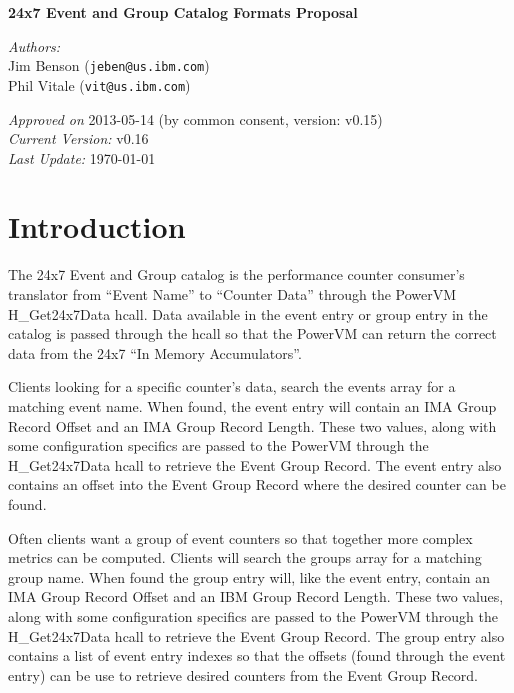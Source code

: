 \documentclass[14]{article}
\begin{document}
\begin{center}

{ \huge \bfseries 24x7 Event and Group Catalog Formats Proposal \\[0.4cm] }

\end{center}
\noindent
\emph{Authors:}\\
Jim Benson (\texttt{jeben@us.ibm.com}) \\
Phil Vitale (\texttt{vit@us.ibm.com}) \\

\begin{center}
\emph{Approved on} 2013-05-14 (by common consent, version: v0.15) \\
\emph{Current Version:} v0.16 \\
\emph{Last Update:} \today
\end{center}

\pagebreak
\tableofcontents
\pagebreak

\section{Introduction}
The 24x7 Event and Group catalog is the performance counter consumer's
translator from ``Event Name'' to ``Counter Data'' through the PowerVM
H\_Get24x7Data hcall. Data available in the event entry or group entry in the
catalog is passed through the hcall so that the PowerVM can return the correct
data from the 24x7 ``In Memory Accumulators''.

Clients looking for a specific counter's data, search the events array for a
matching event name. When found, the event entry will contain an IMA Group
Record Offset and an IMA Group Record Length. These two values, along with some
configuration specifics are passed to the PowerVM through the H\_Get24x7Data
hcall to retrieve the Event Group Record. The event entry also contains an
offset into the Event Group Record where the desired counter can be found.

Often clients want a group of event counters so that together more complex
metrics can be computed. Clients will search the groups array for a matching
group name. When found the group entry will, like the event entry, contain an
IMA Group Record Offset and an IBM Group Record Length. These two values, along
with some configuration specifics are passed to the PowerVM through the
H\_Get24x7Data hcall to retrieve the Event Group Record. The group entry also
contains a list of event entry indexes so that the offsets (found through the
event entry) can be use to retrieve desired counters from the Event Group
Record.
\end{document}
